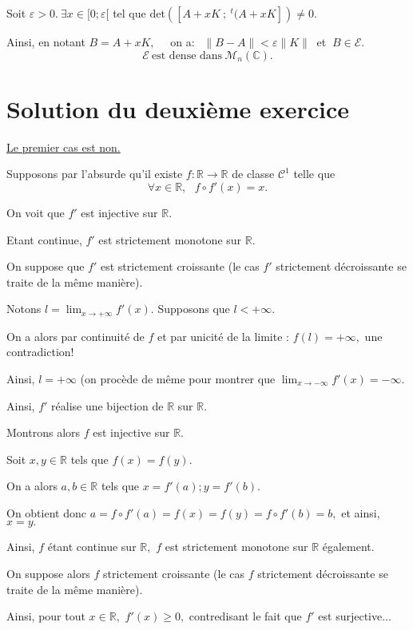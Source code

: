   Soit $  \varepsilon>0.\: \exists x \in [0;\varepsilon[$  tel que  $\text{det} \left([A+xK\: ;\:^t(A+xK]\right) \neq 0 .\:\:$ 
  
  Ainsi, en notant $B = A+ x K,\quad$ on a: $\:\: \|B-A\| <\varepsilon \|K\|\:$ et  $ \: B \in \mathcal E.$ 
    $$\boxed{\mathcal E \: \text{est dense dans}\: \mathcal M_n(\mathbb C).}$$ 
  
\section{Solution du deuxième exercice}

\underline{Le premier cas est non.}

Supposons par l'absurde qu'il existe $f : \mathbb{R} \rightarrow \mathbb{R}$ de classe $\mathcal{C}^{1}$ telle que $$\forall x\in\mathbb{R},\mbox{ } f\circ f'(x)=x.$$

On voit que $f'$ est injective sur $\mathbb{R}$. 

Etant continue, $f'$ est strictement monotone sur $\mathbb{R}.$

On suppose que $f'$ est strictement croissante (le cas $f'$ strictement décroissante se traite de la même manière).

Notons $\displaystyle l=\lim_{x\rightarrow +\infty}f'(x).$ Supposons que $l<+\infty.$

On a alors par continuité de $f$ et par unicité de la limite : $\displaystyle f(l)=+\infty,$ une contradiction! 

Ainsi, $l=+\infty$ (on procède de même pour montrer que $\displaystyle \lim_{x\rightarrow -\infty}f'(x)=-\infty.$

Ainsi, $f'$ réalise une bijection de $\mathbb{R}$ sur $\mathbb{R}.$

Montrons alors $f$ est injective sur $\mathbb{R}.$

Soit $x,y\in\mathbb{R}$ tels que $f(x)=f(y).$ 

On a alors $a,b\in\mathbb{R}$ tels que $x=f'(a);y=f'(b).$

On obtient donc $a=f\circ f'(a)=f(x)=f(y)=f\circ f'(b)=b,$ et ainsi, $x=y.$ 

Ainsi, $f$ étant continue sur $\mathbb{R},$ $f$ est strictement monotone sur $\mathbb{R}$ également.

On suppose alors $f$ strictement croissante (le cas $f$ strictement décroissante se traite de la même manière).

Ainsi, pour tout $x\in\mathbb{R},$ $\displaystyle f'(x)\geq 0,$ contredisant le fait que $f'$ est surjective...\\


